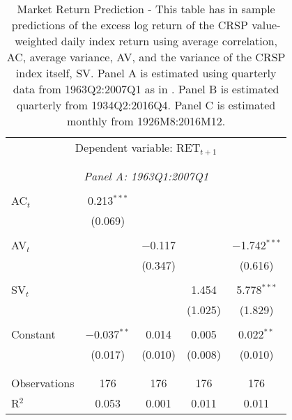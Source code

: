 
\begin{table}[!htbp] \centering 
  \caption{Market Return Prediction - This table has in sample predictions of the excess log return of the CRSP value-weighted daily index return using average correlation, AC, average variance, AV, and the variance of the CRSP index itself, SV. Panel A is estimated using quarterly data from 1963Q2:2007Q1 as in \cite{pollet_average_2010}. Panel B is estimated quarterly from 1934Q2:2016Q4. Panel C is estimated monthly from 1926M8:2016M12.} 
  \label{tab_ret_in} 
	\begin{adjustbox}{height=4in,width=6in}
		\begin{tabular}{@{\extracolsep{5pt}}lcccc}
			\multicolumn{5}{c}{Dependent variable: RET$_{t+1}$} \\ 
			\\[-1.8ex]\hline 
			\hline %
			\\[-1.8ex] \multicolumn{5}{c}{\textit{Panel A: 1963Q1:2007Q1}} \\ 
			\cline{2-5}
			\hline \\[-1.8ex] 
			  AC$_{t}$ & 0.213$^{***}$ &  &  &  \\ 
			  & (0.069) &  &  &  \\ 
			  & & & & \\ 
			  AV$_{t}$ &  & $-$0.117 &  & $-$1.742$^{***}$ \\ 
			  &  & (0.347) &  & (0.616) \\ 
			  & & & & \\ 
			  SV$_{t}$ &  &  & 1.454 & 5.778$^{***}$ \\ 
			  &  &  & (1.025) & (1.829) \\ 
			  & & & & \\ 
			  Constant & $-$0.037$^{**}$ & 0.014 & 0.005 & 0.022$^{**}$ \\ 
			  & (0.017) & (0.010) & (0.008) & (0.010) \\ 
			  & & & & \\ 
			  \hline \\[-1.8ex] 
			  Observations & 176 & 176 & 176 & 176 \\ 
			 R$^{2}$ & 0.053 & 0.001 & 0.011 & 0.011 \\ 

\end{tabular}
\end{adjustbox}
\end{table}
